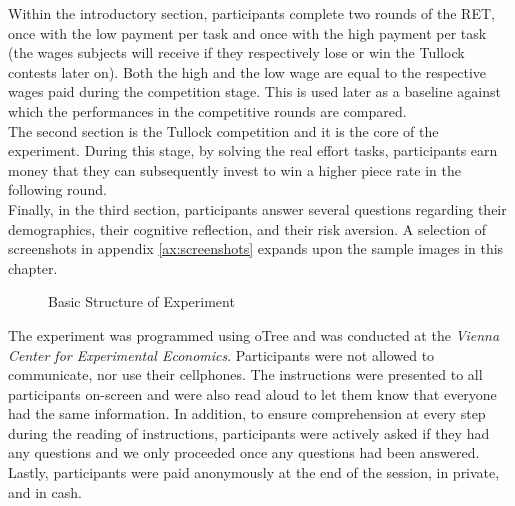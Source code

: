     Within the introductory section, participants complete two rounds of the RET, once with the low payment per task and once with the high payment per task (the wages subjects will receive if they respectively lose or win the Tullock contests later on). Both the high and the low wage are equal to the respective wages paid during the competition stage. This is used later as a baseline against which the performances in the competitive rounds are compared.\\
    
    The second section is the Tullock competition and it is the core of the experiment. During this stage, by solving the real effort tasks, participants earn money that they can subsequently invest to win a higher piece rate in the following round.\\
    
    Finally, in the third section, participants answer several questions regarding their demographics, their cognitive reflection, and their risk aversion. A selection of screenshots in appendix \ref{ax:screenshots} expands upon the sample images in this chapter.\\
    
    \begin{figure}
\centering
{}

\caption{Basic Structure of Experiment}
\label{fig:exp_str}
\end{figure}
    
    The experiment was programmed using oTree \citep{chen2016}
    and was conducted at the \textit{Vienna Center for Experimental Economics}. Participants were not allowed to communicate, nor use their cellphones. The instructions were presented to all participants on-screen and were also read aloud to let them know that everyone had the same information. In addition, to ensure comprehension at every step during the reading of instructions, participants were actively asked if they had any questions and we only proceeded once any questions had been answered. Lastly, participants were paid anonymously at the end of the session, in private, and in cash.
    
